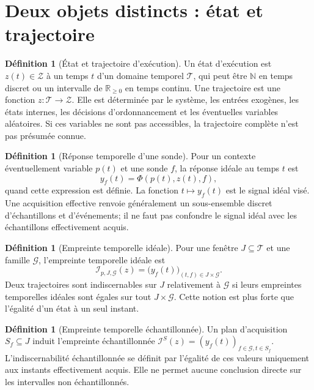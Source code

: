 \documentclass[11pt,oneside]{book}
\theoremstyle{definition}
\newtheorem{definition}[theoreme]{Définition}
\theoremstyle{remark}
\newcommand{\Gcal}{\mathcal G}
\newcommand{\Zcal}{\mathcal Z}
\newcommand{\Tcal}{\mathcal T}
\newcommand{\Ical}{\mathcal I}
\newcommand{\N}{\mathbb N}
\newcommand{\R}{\mathbb R}
\newcommand{\1}{\mathbf 1}
\begin{document}
\section{Deux objets distincts : état et trajectoire}
\begin{definition}[État et trajectoire d'exécution]
Un état d'exécution est $z(t)\in\Zcal$ à un temps $t$ d'un domaine temporel $\Tcal$, qui peut être $\N$ en temps discret ou un intervalle de $\R_{\geq0}$ en temps continu. Une trajectoire est une fonction $z:\Tcal\to\Zcal$. Elle est déterminée par le système, les entrées exogènes, les états internes, les décisions d'ordonnancement et les éventuelles variables aléatoires. Si ces variables ne sont pas accessibles, la trajectoire complète n'est pas présumée connue.
\end{definition}

\begin{definition}[Réponse temporelle d'une sonde]
Pour un contexte éventuellement variable $p(t)$ et une sonde $f$, la réponse idéale au temps $t$ est
\[
y_f(t)=\Phi(p(t),z(t),f),
\]
quand cette expression est définie. La fonction $t\mapsto y_f(t)$ est le signal idéal visé. Une acquisition effective renvoie généralement un sous-ensemble discret d'échantillons et d'événements; il ne faut pas confondre le signal idéal avec les échantillons effectivement acquis.
\end{definition}

\begin{definition}[Empreinte temporelle idéale]
Pour une fenêtre $J\subseteq\Tcal$ et une famille $\Gcal$, l'empreinte temporelle idéale est
\[
\Ical_{p,J,\Gcal}(z)=\bigl(y_f(t)\bigr)_{(t,f)\in J\times\Gcal}.
\]
Deux trajectoires sont indiscernables sur $J$ relativement à $\Gcal$ si leurs empreintes temporelles idéales sont égales sur tout $J\times\Gcal$. Cette notion est plus forte que l'égalité d'un état à un seul instant.
\end{definition}

\begin{definition}[Empreinte temporelle échantillonnée]
Un plan d'acquisition $S_f\subseteq J$ induit l'empreinte échantillonnée $\Ical^S(z)=(y_f(t))_{f\in\Gcal,t\in S_f}$. L'indiscernabilité échantillonnée se définit par l'égalité de ces valeurs uniquement aux instants effectivement acquis. Elle ne permet aucune conclusion directe sur les intervalles non échantillonnés.
\end{definition}
\end{document}
